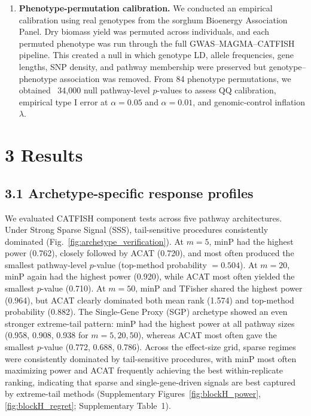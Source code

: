 \documentclass[unnumsec,webpdf,contemporary,large]{oup-authoring-template}%
\theoremstyle{thmstyleone}%
\theoremstyle{thmstyletwo}%
\theoremstyle{thmstylethree}%
\begin{document}
\begin{enumerate}
\item \textbf{Phenotype-permutation calibration.}
We conducted an empirical calibration using real genotypes from the sorghum Bioenergy Association Panel. Dry biomass yield was permuted across individuals, and each permuted phenotype was run through the full GWAS–MAGMA–CATFISH pipeline. This created a null in which genotype LD, allele frequencies, gene lengths, SNP density, and pathway membership were preserved but genotype–phenotype association was removed. From 84 phenotype permutations, we obtained ~34,000 null pathway-level $p$-values to assess QQ calibration, empirical type I error at $\alpha=0.05$ and $\alpha=0.01$, and genomic-control inflation $\lambda$.


\end{enumerate}




\section{3 Results}

\subsection*{3.1 Archetype-specific response profiles}

We evaluated CATFISH component tests across five pathway architectures. Under Strong Sparse Signal (SSS), tail-sensitive procedures consistently dominated (Fig.~\ref{fig:archetype_verification}). At \(m=5\), minP had the highest power (0.762), closely followed by ACAT (0.720), and most often produced the smallest pathway-level \(p\)-value (top-method probability \(=0.504\)). At \(m=20\), minP again had the highest power (0.920), while ACAT most often yielded the smallest \(p\)-value (0.710). At \(m=50\), minP and TFisher shared the highest power (0.964), but ACAT clearly dominated both mean rank (1.574) and top-method probability (0.882). The Single-Gene Proxy (SGP) archetype showed an even stronger extreme-tail pattern: minP had the highest power at all pathway sizes (0.958, 0.908, 0.938 for \(m=5,20,50\)), whereas ACAT most often gave the smallest \(p\)-value (0.772, 0.688, 0.786). Across the effect-size grid, sparse regimes were consistently dominated by tail-sensitive procedures, with minP most often maximizing power and ACAT frequently achieving the best within-replicate ranking, indicating that sparse and single-gene-driven signals are best captured by extreme-tail methods (Supplementary Figures~\ref{fig:blockH_power}, \ref{fig:blockH_regret}; Supplementary Table~1).
\end{document}
